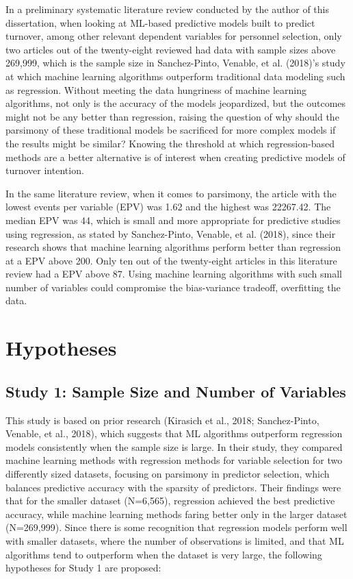 \documentclass[
  jou]{apa6}
\begin{document}
In a preliminary systematic literature review conducted by the author of this dissertation, when looking at ML-based predictive models built to predict turnover, among other relevant dependent variables for personnel selection, only two articles out of the twenty-eight reviewed had data with sample sizes above 269,999, which is the sample size in Sanchez-Pinto, Venable, et al. (2018)'s study at which machine learning algorithms outperform traditional data modeling such as regression.
Without meeting the data hungriness of machine learning algorithms, not only is the accuracy of the models jeopardized, but the outcomes might not be any better than regression, raising the question of why should the parsimony of these traditional models be sacrificed for more complex models if the results might be similar? Knowing the threshold at which regression-based methods are a better alternative is of interest when creating predictive models of turnover intention.

In the same literature review, when it comes to parsimony, the article with the lowest events per variable (EPV) was 1.62 and the highest was 22267.42.
The median EPV was 44, which is small and more appropriate for predictive studies using regression, as stated by Sanchez-Pinto, Venable, et al. (2018), since their research shows that machine learning algorithms perform better than regression at a EPV above 200.
Only ten out of the twenty-eight articles in this literature review had a EPV above 87.
Using machine learning algorithms with such small number of variables could compromise the bias-variance tradeoff, overfitting the data.

\hypertarget{hypotheses}{%
\section{Hypotheses}\label{hypotheses}}

\hypertarget{study-1-sample-size-and-number-of-variables}{%
\subsection{Study 1: Sample Size and Number of Variables}\label{study-1-sample-size-and-number-of-variables}}

This study is based on prior research (Kirasich et al., 2018; Sanchez-Pinto, Venable, et al., 2018), which suggests that ML algorithms outperform regression models consistently when the sample size is large.
In their study, they compared machine learning methods with regression methods for variable selection for two differently sized datasets, focusing on parsimony in predictor selection, which balances predictive accuracy with the sparsity of predictors.
Their findings were that for the smaller dataset (N=6,565), regression achieved the best predictive accuracy, while machine learning methods faring better only in the larger dataset (N=269,999).
Since there is some recognition that regression models perform well with smaller datasets, where the number of observations is limited, and that ML algorithms tend to outperform when the dataset is very large, the following hypotheses for Study 1 are proposed:
\end{document}
